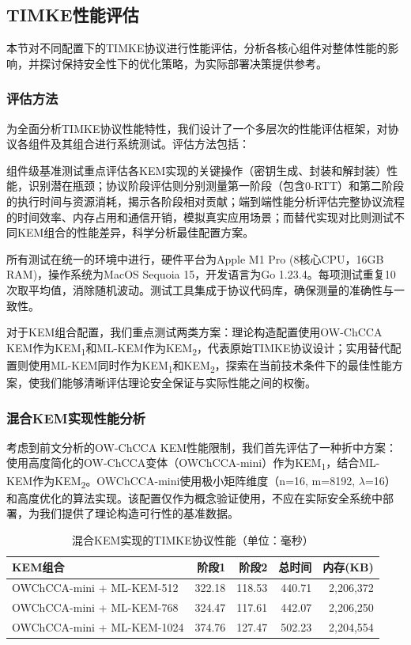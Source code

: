 \subsection{TIMKE性能评估}

本节对不同配置下的TIMKE协议进行性能评估，分析各核心组件对整体性能的影响，并探讨保持安全性下的优化策略，为实际部署决策提供参考。

\subsubsection{评估方法}

为全面分析TIMKE协议性能特性，我们设计了一个多层次的性能评估框架，对协议各组件及其组合进行系统测试。评估方法包括：

组件级基准测试重点评估各KEM实现的关键操作（密钥生成、封装和解封装）性能，识别潜在瓶颈；协议阶段评估则分别测量第一阶段（包含0-RTT）和第二阶段的执行时间与资源消耗，揭示各阶段相对贡献；端到端性能分析评估完整协议流程的时间效率、内存占用和通信开销，模拟真实应用场景；而替代实现对比则测试不同KEM组合的性能差异，科学分析最佳配置方案。

所有测试在统一的环境中进行，硬件平台为Apple M1 Pro (8核心CPU，16GB RAM)，操作系统为MacOS Sequoia 15，开发语言为Go 1.23.4。每项测试重复10次取平均值，消除随机波动。测试工具集成于协议代码库，确保测量的准确性与一致性。

对于KEM组合配置，我们重点测试两类方案：理论构造配置使用OW-ChCCA KEM作为KEM\textsubscript{1}和ML-KEM作为KEM\textsubscript{2}，代表原始TIMKE协议设计；实用替代配置则使用ML-KEM同时作为KEM\textsubscript{1}和KEM\textsubscript{2}，探索在当前技术条件下的最佳性能方案，使我们能够清晰评估理论安全保证与实际性能之间的权衡。

\subsubsection{混合KEM实现性能分析}

考虑到前文分析的OW-ChCCA KEM性能限制，我们首先评估了一种折中方案：使用高度简化的OW-ChCCA变体（OWChCCA-mini）作为KEM\textsubscript{1}，结合ML-KEM作为KEM\textsubscript{2}。OWChCCA-mini使用极小矩阵维度（n=16, m=8192, $\lambda$=16）和高度优化的算法实现。该配置仅作为概念验证使用，不应在实际安全系统中部署，为我们提供了理论构造可行性的基准数据。

\begin{table}[ht]
\centering
\caption{混合KEM实现的TIMKE协议性能（单位：毫秒）}
\label{tab:timke-hybrid-perf}
\begin{tabular}{|l|r|r|r|r|}
\hline
\textbf{KEM组合} & \textbf{阶段1} & \textbf{阶段2} & \textbf{总时间} & \textbf{内存(KB)} \\
\hline
OWChCCA-mini + ML-KEM-512    & 322.18  & 118.53  & 440.71  & 2,206,372   \\
\hline
OWChCCA-mini + ML-KEM-768    & 324.47  & 117.61  & 442.07  & 2,206,250   \\
\hline
OWChCCA-mini + ML-KEM-1024   & 374.76  & 127.47  & 502.23  & 2,204,554   \\
\hline
\end{tabular}
\end{table}

